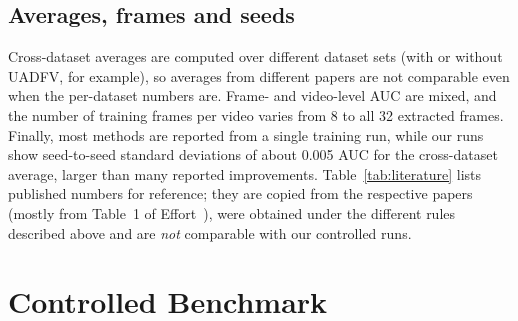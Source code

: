 \documentclass[fonts]{icst}
\begin{document}
\subsection{Averages, frames and seeds}
Cross-dataset averages are computed over different dataset sets (with or without UADFV, for example), so averages from different papers are not comparable even when the per-dataset numbers are. Frame- and video-level AUC are mixed, and the number of training frames per video varies from 8 to all 32 extracted frames. Finally, most methods are reported from a single training run, while our runs show seed-to-seed standard deviations of about 0.005 AUC for the cross-dataset average, larger than many reported improvements. Table~\ref{tab:literature} lists published numbers for reference; they are copied from the respective papers (mostly from Table~1 of Effort~\cite{yan2025effort}), were obtained under the different rules described above and are \emph{not} comparable with our controlled runs.

\begin{table}[!t]
\centering
\caption{Published video AUC of detectors trained on FF++ c23, as reported by their authors (mostly Table~1 of Effort~\cite{yan2025effort}). Selection rules, frames and seeds differ between rows; the numbers are listed for reference only and are not comparable with Tables~\ref{tab:main}--\ref{tab:perdataM}. $^\dagger$: values reported by Effort.}
\label{tab:literature}
\resizebox{\textwidth}{!}{}
\end{table}

\section{Controlled Benchmark}
\label{sec:bench}
\end{document}
